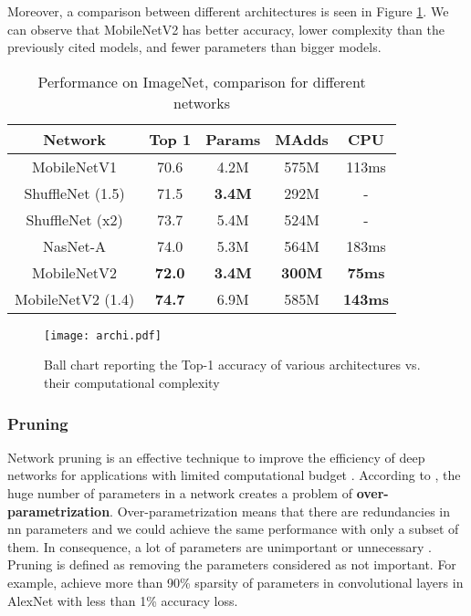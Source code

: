 Moreover, a comparison between different architectures is seen in Figure \ref{fig:archi}. We can observe that MobileNetV2 has better accuracy, lower complexity than the previously cited models, and fewer parameters than bigger models.
%
\begin{table}
    \center
    \begin{tabular}{ | c | c | c c | c| }
        \hline \hline
        Network & Top 1 & Params & MAdds & CPU \\
        \hline \hline
        MobileNetV1 & 70.6 & 4.2M & 575M & 113ms \\
        ShuffleNet (1.5) & 71.5 & \textbf{3.4M} & 292M & - \\
        ShuffleNet (x2)  & 73.7 & 5.4M & 524M & - \\
        NasNet-A & 74.0 & 5.3M & 564M & 183ms \\
        \hline
        MobileNetV2 & \textbf{72.0} & \textbf{3.4M} & \textbf{300M} & \textbf{75ms} \\
        MobileNetV2 (1.4) & \textbf{74.7} & 6.9M & 585M & \textbf{143ms} \\
        \hline \hline
    \end{tabular}
    \caption{Performance on ImageNet, comparison for different networks \cite{sandler_mobilenetv2_2019}}
    \label{tab:mbv2}
\end{table}
%
\begin{figure}
    \centering
    \texttt{[image: archi.pdf]}
    \caption{Ball chart reporting the Top-1 accuracy of various architectures vs. their computational complexity \cite{canziani_analysis_2017}}
    \label{fig:archi}
\end{figure}
%
\subsubsection{Pruning} \label{subs:pruning}
Network pruning is an effective technique to improve the efficiency of deep networks for applications with limited computational budget \cite{liu_rethinking_2019}. According to \textcite{denton_exploiting_2014, liu_rethinking_2019}, the huge number of parameters in a network creates a problem of \textbf{over-parametrization}. Over-parametrization means that there are redundancies in \acrshort{nn} parameters and we could achieve the same performance with only a subset of them. In consequence, a lot of parameters are unimportant or unnecessary \cite{cheng_recent_2018}. Pruning is defined as removing the parameters considered as not important. For example, \textcite{baoyuan_liu_sparse_2015} achieve more than 90\% sparsity of parameters in convolutional layers in AlexNet with less than 1\% accuracy loss.

